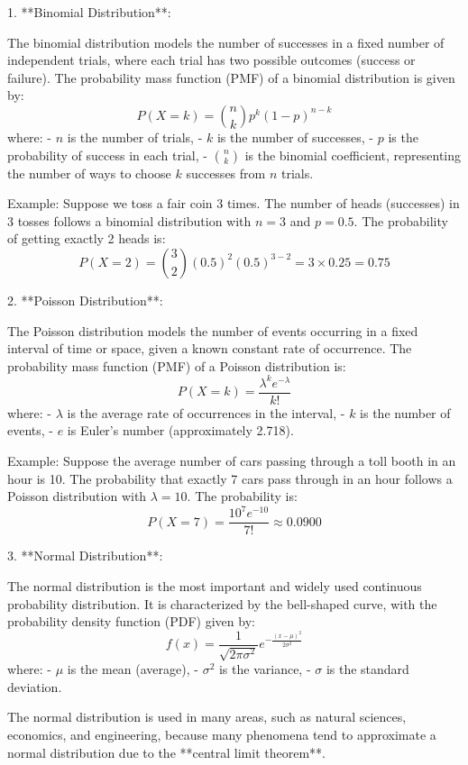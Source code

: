\documentclass{article}
\begin{document}
1. **Binomial Distribution**:

   The binomial distribution models the number of successes in a fixed number of independent trials, where each trial has two possible outcomes (success or failure). The probability mass function (PMF) of a binomial distribution is given by:
   \[
   P(X = k) = \binom{n}{k} p^k (1 - p)^{n-k}
   \]
   where:
   - \( n \) is the number of trials,
   - \( k \) is the number of successes,
   - \( p \) is the probability of success in each trial,
   - \( \binom{n}{k} \) is the binomial coefficient, representing the number of ways to choose \( k \) successes from \( n \) trials.

   Example: Suppose we toss a fair coin 3 times. The number of heads (successes) in 3 tosses follows a binomial distribution with \( n = 3 \) and \( p = 0.5 \). The probability of getting exactly 2 heads is:
   \[
   P(X = 2) = \binom{3}{2} (0.5)^2 (0.5)^{3-2} = 3 \times 0.25 = 0.75
   \]

2. **Poisson Distribution**:

   The Poisson distribution models the number of events occurring in a fixed interval of time or space, given a known constant rate of occurrence. The probability mass function (PMF) of a Poisson distribution is:
   \[
   P(X = k) = \frac{\lambda^k e^{-\lambda}}{k!}
   \]
   where:
   - \( \lambda \) is the average rate of occurrences in the interval,
   - \( k \) is the number of events,
   - \( e \) is Euler’s number (approximately 2.718).

   Example: Suppose the average number of cars passing through a toll booth in an hour is 10. The probability that exactly 7 cars pass through in an hour follows a Poisson distribution with \( \lambda = 10 \). The probability is:
   \[
   P(X = 7) = \frac{10^7 e^{-10}}{7!} \approx 0.0900
   \]

3. **Normal Distribution**:

   The normal distribution is the most important and widely used continuous probability distribution. It is characterized by the bell-shaped curve, with the probability density function (PDF) given by:
   \[
   f(x) = \frac{1}{\sqrt{2\pi \sigma^2}} e^{-\frac{(x - \mu)^2}{2\sigma^2}}
   \]
   where:
   - \( \mu \) is the mean (average),
   - \( \sigma^2 \) is the variance,
   - \( \sigma \) is the standard deviation.

   The normal distribution is used in many areas, such as natural sciences, economics, and engineering, because many phenomena tend to approximate a normal distribution due to the **central limit theorem**.
\end{document}
